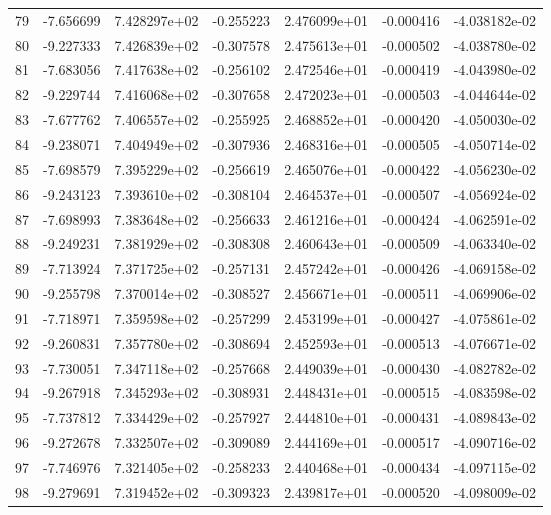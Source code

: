 \begin{tabular}{rrrrrrr}
  79 &  -7.656699 &  7.428297e+02 & -0.255223 &  2.476099e+01 &   -0.000416 & -4.038182e-02 \\
  80 &  -9.227333 &  7.426839e+02 & -0.307578 &  2.475613e+01 &   -0.000502 & -4.038780e-02 \\
  81 &  -7.683056 &  7.417638e+02 & -0.256102 &  2.472546e+01 &   -0.000419 & -4.043980e-02 \\
  82 &  -9.229744 &  7.416068e+02 & -0.307658 &  2.472023e+01 &   -0.000503 & -4.044644e-02 \\
  83 &  -7.677762 &  7.406557e+02 & -0.255925 &  2.468852e+01 &   -0.000420 & -4.050030e-02 \\
  84 &  -9.238071 &  7.404949e+02 & -0.307936 &  2.468316e+01 &   -0.000505 & -4.050714e-02 \\
  85 &  -7.698579 &  7.395229e+02 & -0.256619 &  2.465076e+01 &   -0.000422 & -4.056230e-02 \\
  86 &  -9.243123 &  7.393610e+02 & -0.308104 &  2.464537e+01 &   -0.000507 & -4.056924e-02 \\
  87 &  -7.698993 &  7.383648e+02 & -0.256633 &  2.461216e+01 &   -0.000424 & -4.062591e-02 \\
  88 &  -9.249231 &  7.381929e+02 & -0.308308 &  2.460643e+01 &   -0.000509 & -4.063340e-02 \\
  89 &  -7.713924 &  7.371725e+02 & -0.257131 &  2.457242e+01 &   -0.000426 & -4.069158e-02 \\
  90 &  -9.255798 &  7.370014e+02 & -0.308527 &  2.456671e+01 &   -0.000511 & -4.069906e-02 \\
  91 &  -7.718971 &  7.359598e+02 & -0.257299 &  2.453199e+01 &   -0.000427 & -4.075861e-02 \\
  92 &  -9.260831 &  7.357780e+02 & -0.308694 &  2.452593e+01 &   -0.000513 & -4.076671e-02 \\
  93 &  -7.730051 &  7.347118e+02 & -0.257668 &  2.449039e+01 &   -0.000430 & -4.082782e-02 \\
  94 &  -9.267918 &  7.345293e+02 & -0.308931 &  2.448431e+01 &   -0.000515 & -4.083598e-02 \\
  95 &  -7.737812 &  7.334429e+02 & -0.257927 &  2.444810e+01 &   -0.000431 & -4.089843e-02 \\
  96 &  -9.272678 &  7.332507e+02 & -0.309089 &  2.444169e+01 &   -0.000517 & -4.090716e-02 \\
  97 &  -7.746976 &  7.321405e+02 & -0.258233 &  2.440468e+01 &   -0.000434 & -4.097115e-02 \\
  98 &  -9.279691 &  7.319452e+02 & -0.309323 &  2.439817e+01 &   -0.000520 & -4.098009e-02 \\

\end{tabular}
